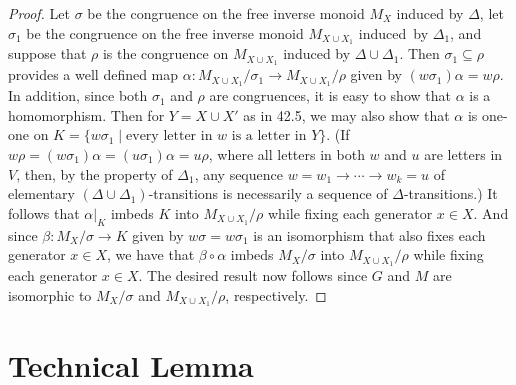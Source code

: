 \documentclass{surv-l}
\numberwithin{equation}{section}
\numberwithin{table}{section}
\numberwithin{figure}{section}
\theoremstyle{plain}
\theoremstyle{definition}
\begin{document}
\begin{proof} Let $\sigma$ be the congruence on the free inverse monoid
$M_{X}$ induced by $\Delta$, let $\sigma_{1}$ be the congruence
on the free inverse monoid $M_{X\cup X_{1}}$ induced~by
$\Delta_{1}$, and suppose that $\rho$ is the congruence on
$M_{X\cup X_{1}}$ induced by $\Delta\cup\Delta_{1}$. Then
$\sigma_{1}\subseteq\rho$ provides a well defined map $\alpha :
M_{X\cup X_{1}}/\sigma_{1}\rightarrow M_{X\cup X_{1}}/\rho$ given
by $(w\sigma_{1})\alpha=w\rho$. In addition, since both
$\sigma_{1}$ and $\rho$ are congruences, it is easy to show that
$\alpha$ is a homomorphism. Then for $Y= X\cup X'$ as in 42.5, we
may also show that $\alpha$ is one-one on $K=\{w\sigma_{1} \mid
\text{every letter in }w\text{ is a letter in }Y\}$. (If
$w\rho=(w\sigma_{1})\alpha=(u\sigma_{1})\alpha=u\rho$, where all
letters in both $w$ and $u$ are letters in $V$, then, by the
property of $\Delta_{1}$, any sequence
$w=w_{1}\rightarrow\cdots\rightarrow w_{k}=u$ of elementary
$(\Delta\cup\Delta_{1})$-transitions is necessarily a
sequence of $\Delta$-transitions.) It follows that
$\alpha|_{K}$ imbeds $K$ into $M_{X\cup X_{1}}/\rho$ while fixing
each generator $ x\in X$. And since $\beta :
M_{X}/\sigma\rightarrow K$ given by $w\sigma =w\sigma_{1}$ is an
isomorphism that also fixes each generator $x\in X$, we have that
$\beta \circ\alpha$ imbeds $M_{X}/\sigma$ into $M_{X\cup
X_{1}}/\rho$ while fixing each generator $ x\in X$. The desired
result now follows since $G$ and $M$ are isomorphic to
$M_{X}/\sigma$ and $M_{X\cup X_{1}}/\rho$, respectively.
\end{proof}

\section{Technical Lemma}\label{sec9.43}
\end{document}
